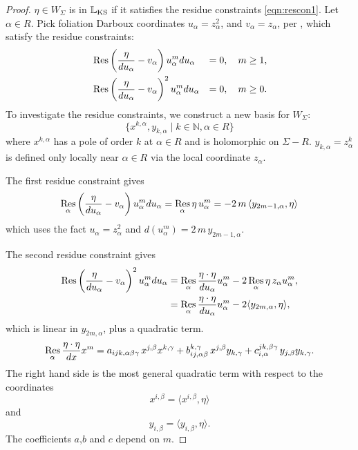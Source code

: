     \begin{proof}
    \(\eta \in W_\Sigma\) is in \(\mathbb{L}_{\text{KS}}\) if it satisfies the residue constraints \eqref{eqn:rescon1}. 
    Let \(\alpha \in R\). Pick foliation Darboux coordinates \(u_\alpha=z^2_\alpha\), and  \(v_\alpha=z_\alpha\), per \cite{chaimanowong2020airy,ks_airy}, which satisfy the residue constraints:
    \begin{alignat*}{3} 
    &\operatorname*{Res}\left(\frac{\eta}{du_\alpha}-v_\alpha\right)u_\alpha^mdu_\alpha   &=0,\quad m\geq 1,\\
    &\operatorname*{Res}\left(\frac{\eta}{du_\alpha}-v_\alpha\right)^2u_\alpha^mdu_\alpha &=0,\quad m\geq 0.
    \end{alignat*}
    To investigate the residue constraints, we construct a new basis for \(W_\Sigma\): 
    \[\{x^{k,\alpha},y_{k,\alpha}\mid k\in\mathbb{N},\alpha\in R\}\]
    where \(x^{k,\alpha}\) has a pole of order \(k\) at \(\alpha \in R\) and is holomorphic on \(\Sigma-R\). \(y_{k,\alpha}=z_\alpha^k\) is defined only locally near \(\alpha \in R\) via the local coordinate \(z_\alpha\).
    
    The first residue constraint gives 
    \[ \operatorname*{Res}_\alpha\left(\frac{\eta}{du_\alpha}-v_\alpha\right)u_\alpha^mdu_\alpha=\operatorname*{Res}_\alpha\eta\, u_\alpha^m=-2\,m\,\langle y_{2m-1,\alpha},\eta\rangle
    \]
    which uses the fact \(u_\alpha=z_\alpha^2\) and \(d(u_\alpha^m)=2\,m\,y_{2m-1,\alpha}\).
    
    The second residue constraint gives 
    \begin{align*}
    \operatorname*{Res}\left(\frac{\eta}{du_\alpha}-v_\alpha\right)^2u_\alpha^mdu_\alpha &= \operatorname*{Res}_\alpha\frac{\eta\cdot\eta }{du_\alpha}u_\alpha^m-2 \operatorname*{Res}_\alpha \eta\, z_\alpha u_\alpha^m,\\
    &=\operatorname*{Res}_\alpha\frac{\eta\cdot\eta }{du_\alpha}u_\alpha^m-2\langle y_{2m,\alpha},\eta\rangle,
    \end{align*} 
    which is linear in \(y_{2m,\alpha}\), plus a quadratic term.
    \begin{equation}
    \label{eqn:ff}
    \operatorname*{Res}_\alpha\frac{\eta\cdot\eta }{dx}x^m=a_{ijk,\alpha\beta\gamma} \, x^{j,\beta} x^{k,\gamma}+b_{ij,\alpha \beta}^{k,\gamma }\, x^{j,\beta} y_{k,\gamma}+c_{i ,\alpha}^{jk ,\beta \gamma}\, y_{j,\beta} y_{k,\gamma}.
    \end{equation}
    The right hand side is the most general quadratic term with respect to the coordinates \[x^{i,\beta}=\langle x^{i,\beta},\eta\rangle \] 
    and 
    \[ y_{i,\beta} =\langle y_{i,\beta},\eta\rangle.\]   
    The coefficients \(a\),\(b\) and \(c\) depend on \(m\).  
    

\end{proof}
